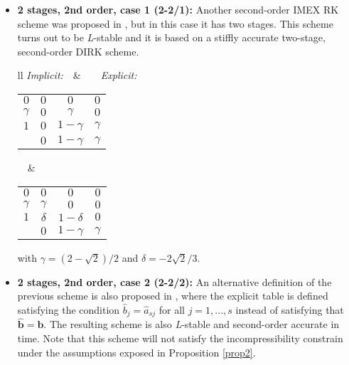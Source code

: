 \begin{itemize}
\begin{center}
\begin{tabular}{ll}
\textit{Implicit:}$\quad$&$\quad\quad$\textit{Explicit:}\\
\begin{tabular}{c|cc}
$0$&$0$&$0$\\
$\frac{1}{2}$&$0$&$\frac{1}{2}$\\
\hline
&$0$&$1$
\end{tabular}$\quad$&
$\quad\quad$\begin{tabular}{c|cc}
$0$&$0$&$0$\\
$\frac{1}{2}$&$\frac{1}{2}$&$0$\\
\hline
&$0$&$1$
\end{tabular}
\end{tabular}
\end{center}
\item \textbf{2 stages, 2nd order, case 1 (2-2/1):}
Another second-order IMEX RK scheme was proposed in \cite{ascher_implicit-explicit_1997}, but in this case it has two stages. This scheme turns out to be \textit{L}-stable and it is based on a stiffly accurate two-stage, second-order DIRK scheme.
\begin{center}
\begin{tabular}{ll}
\textit{Implicit:}$\quad$&$\quad\quad$\textit{Explicit:}\\
\begin{tabular}{c|ccc}
$0$&$0$&$0$&$0$\\
$\gamma$&$0$&$\gamma$&$0$\\
$1$&$0$&$1-\gamma$&$\gamma$\\
\hline
&$0$&$1-\gamma$&$\gamma$
\end{tabular}$\quad$&
$\quad\quad$\begin{tabular}{c|ccc}
$0$&$0$&$0$&$0$\\
$\gamma$&$\gamma$&$0$&$0$\\
$1$&$\delta$&$1-\delta$&$0$\\
\hline
&$0$&$1-\gamma$&$\gamma$
\end{tabular}
\end{tabular}
\end{center}
with $\gamma=(2-\sqrt{2})/2$ and $\delta=-2\sqrt{2}/3$.
\item \textbf{2 stages, 2nd order, case 2 (2-2/2):}
An alternative definition of the previous scheme is also proposed in \cite{ascher_implicit-explicit_1997}, where the explicit table is defined satisfying the condition $\hat{b}_j=\hat{a}_{sj}$ for all $j=1,...,s$ instead of satisfying that $\hat{\mathbf{b}}=\mathbf{b}$. The resulting scheme is also \textit{L}-stable and second-order accurate in time. Note that this scheme will not satisfy the incompressibility constrain under the assumptions exposed in Proposition \ref{prop2}.

\end{itemize}

